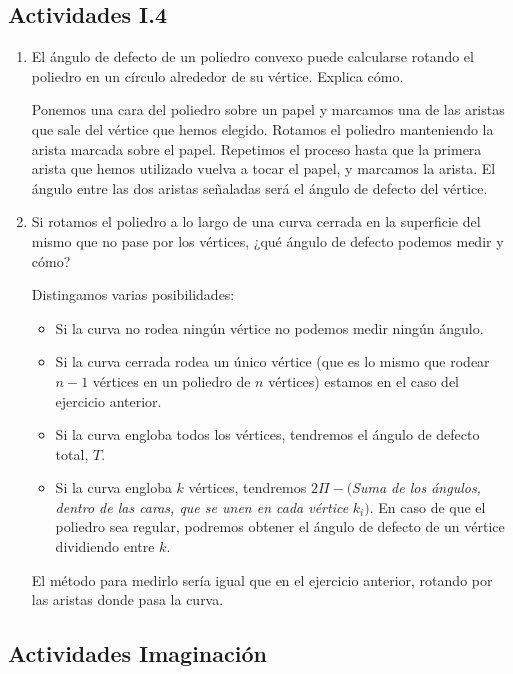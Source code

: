 \subsection{Actividades I.4}
\begin{enumerate}
	\item El ángulo de defecto de un poliedro convexo puede calcularse rotando el poliedro en un círculo alrededor de su vértice. Explica cómo.
	
	Ponemos una cara del poliedro sobre un papel y marcamos una de las aristas que sale del vértice que hemos elegido. Rotamos el poliedro manteniendo la arista marcada sobre el papel. Repetimos el proceso hasta que la primera arista que hemos utilizado vuelva a tocar el papel, y marcamos la arista. El ángulo entre las dos aristas señaladas será el ángulo de defecto del vértice.
	
	\item Si rotamos el poliedro a lo largo de una curva cerrada en la superficie del mismo que no pase por los vértices, ¿qué ángulo de defecto podemos medir y cómo?
	
	Distingamos varias posibilidades:
	
	\begin{itemize}
		\item Si la curva no rodea ningún vértice no podemos medir ningún ángulo.
		\item Si la curva cerrada rodea un único vértice (que es lo mismo que rodear $n-1$ vértices en un poliedro de $n$ vértices) estamos en el caso del ejercicio anterior.
		\item Si la curva engloba todos los vértices, tendremos el ángulo de defecto total, $T$.
		\item Si la curva engloba $k$ vértices, tendremos $2\Pi-($\textit{Suma de los ángulos, dentro de las caras, que se unen en cada vértice} $k_i)$. En caso de que el poliedro sea regular, podremos obtener el ángulo de defecto de un vértice dividiendo entre $k$.
	\end{itemize}
	
	El método para medirlo sería igual que en el ejercicio anterior, rotando por las aristas donde pasa la curva.
\end{enumerate}

\subsection{Actividades Imaginación}

